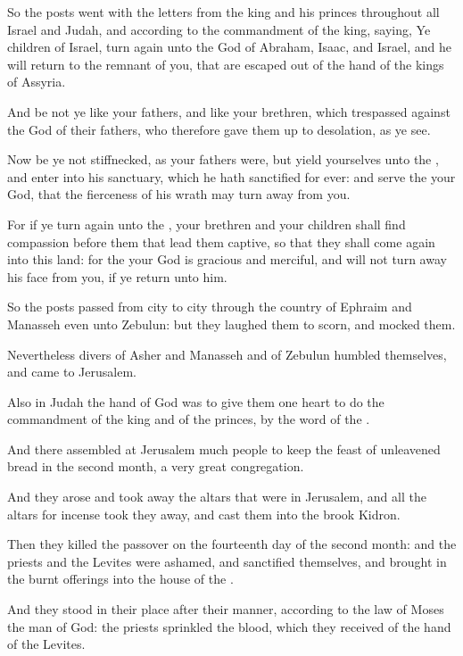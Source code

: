 \verse So the posts went with the letters from the king and his princes throughout all Israel and Judah, and according to the commandment of the king, saying, Ye children of Israel, turn again unto the \LORD God of Abraham, Isaac, and Israel, and he will return to the remnant of you, that are escaped out of the hand of the kings of Assyria.

\verse And be not ye like your fathers, and like your brethren, which trespassed against the \LORD God of their fathers, who therefore gave them up to desolation, as ye see.

\verse Now be ye not stiffnecked, as your fathers were, but yield yourselves unto the \LORD, and enter into his sanctuary, which he hath sanctified for ever: and serve the \LORD your God, that the fierceness of his wrath may turn away from you.

\verse For if ye turn again unto the \LORD, your brethren and your children shall find compassion before them that lead them captive, so that they shall come again into this land: for the \LORD your God is gracious and merciful, and will not turn away his face from you, if ye return unto him.

\verse So the posts passed from city to city through the country of Ephraim and Manasseh even unto Zebulun: but they laughed them to scorn, and mocked them.

\verse Nevertheless divers of Asher and Manasseh and of Zebulun humbled themselves, and came to Jerusalem.

\verse Also in Judah the hand of God was to give them one heart to do the commandment of the king and of the princes, by the word of the \LORD.

\verse And there assembled at Jerusalem much people to keep the feast of unleavened bread in the second month, a very great congregation.

\verse And they arose and took away the altars that were in Jerusalem, and all the altars for incense took they away, and cast them into the brook Kidron.

\verse Then they killed the passover on the fourteenth day of the second month: and the priests and the Levites were ashamed, and sanctified themselves, and brought in the burnt offerings into the house of the \LORD.

\verse And they stood in their place after their manner, according to the law of Moses the man of God: the priests sprinkled the blood, which they received of the hand of the Levites.

